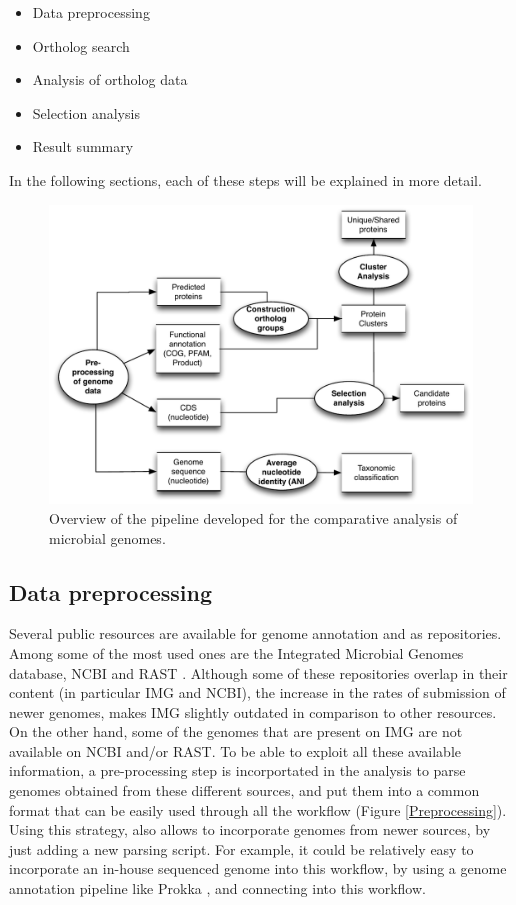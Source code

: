 \begin{itemize}
\item Data preprocessing
\item Ortholog search
\item Analysis of ortholog data
\item Selection analysis
\item Result summary
\end{itemize}

In the following sections, each of these steps will be explained in more detail.

\begin{figure}[htbp]
	\centering
	\includegraphics[width=\textwidth]{Chapter6/Figures/WorkflowOverview.pdf}
	\caption[Overview of the pipeline developed for the comparative analysis of microbial genomes]{Overview of the pipeline developed for the comparative analysis of microbial genomes.}
	\label{CompGenomePipeline}
\end{figure}

\subsection{Data preprocessing}

Several public resources are available for genome annotation and as repositories. Among some of the most used ones are the Integrated Microbial Genomes database\cite{Markowitz:2011ck}, NCBI and RAST \cite{Aziz:2008ku}. Although some of these repositories overlap in their content (in particular IMG and NCBI), the increase in the rates of submission of newer genomes, makes IMG slightly outdated in comparison to other resources. On the other hand, some of the genomes that are present on IMG are not available on NCBI and/or RAST. To be able to exploit all these available information, a pre-processing step is incorportated in the analysis to parse genomes obtained from these different sources, and put them into a common format that can be easily used through all the workflow (Figure \ref{Preprocessing}). Using this strategy, also allows to incorporate genomes from newer sources, by just adding a new parsing script. For example, it could be relatively easy to incorporate an in-house sequenced genome into this workflow, by using a genome annotation pipeline like Prokka \cite{Seemann:2014ks}, and connecting into this workflow.

